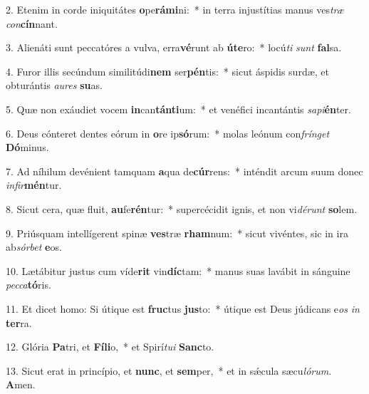 2. Etenim in corde iniquitátes \textbf{o}pe\textbf{rá}\textbf{mi}ni:~*  in terra injustítias manus ves\textit{træ} \textit{con}\textbf{cín}nant.\

3. Alienáti sunt peccatóres a vulva, erra\textbf{vé}runt ab \textbf{ú}\textbf{te}ro:~*  locú\textit{ti} \textit{sunt} \textbf{fal}sa.\

4. Furor illis secúndum similitúdi\textbf{nem} ser\textbf{pén}tis:~*  sicut áspidis surdæ, et obturántis \textit{au}\textit{res} \textbf{su}as.\

5. Quæ non exáudiet vocem \textbf{in}can\textbf{tán}\textbf{ti}um:~*  et venéfici incantántis \textit{sa}\textit{pi}\textbf{én}ter.\

6. Deus cónteret dentes eórum in \textbf{o}re ip\textbf{só}rum:~*  molas leónum con\textit{frín}\textit{get} \textbf{Dó}minus.\

7. Ad níhilum devénient tamquam \textbf{a}qua de\textbf{cúr}rens:~*  inténdit arcum suum donec \textit{in}\textit{fir}\textbf{mén}tur.\

8. Sicut cera, quæ fluit, \textbf{au}fe\textbf{rén}tur:~*  supercécidit ignis, et non vi\textit{dé}\textit{runt} \textbf{so}lem.\

9. Priúsquam intellígerent spinæ \textbf{ves}træ \textbf{rham}num:~*  sicut vivéntes, sic in ira ab\textit{sór}\textit{bet} \textbf{e}os.\

10. Lætábitur justus cum víde\textbf{rit} vin\textbf{díc}tam:~*  manus suas lavábit in sánguine \textit{pec}\textit{ca}\textbf{tó}ris.\

11. Et dicet homo: Si útique est \textbf{fruc}tus \textbf{jus}to:~*  útique est Deus júdicans e\textit{os} \textit{in} \textbf{ter}ra.\

12. Glória \textbf{Pa}tri, et \textbf{Fí}\textbf{li}o,~*  et Spirí\textit{tu}\textit{i} \textbf{Sanc}to.\

13. Sicut erat in princípio, et \textbf{nunc}, et \textbf{sem}per,~*  et in sǽcula sæcu\textit{ló}\textit{rum}. \textbf{A}men.\

